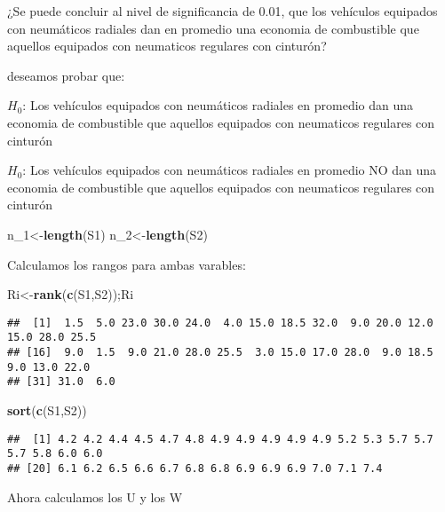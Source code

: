 \documentclass[
]{article}
\newenvironment{Shaded}{\begin{snugshade}}{\end{snugshade}}
\newcommand{\FunctionTok}[1]{\textcolor[rgb]{0.13,0.29,0.53}{\textbf{#1}}}
\newcommand{\NormalTok}[1]{#1}
\newcommand{\OtherTok}[1]{\textcolor[rgb]{0.56,0.35,0.01}{#1}}
\begin{document}
¿Se puede concluir al nivel de significancia de 0.01, que los vehículos
equipados con neumáticos radiales dan en promedio una economia de
combustible que aquellos equipados con neumaticos regulares con
cinturón?

deseamos probar que:

\(H_0\): Los vehículos equipados con neumáticos radiales en promedio dan
una economia de combustible que aquellos equipados con neumaticos
regulares con cinturón

\(H_0\): Los vehículos equipados con neumáticos radiales en promedio NO
dan una economia de combustible que aquellos equipados con neumaticos
regulares con cinturón

\begin{Shaded}
\begin{Highlighting}[]
\NormalTok{n\_1}\OtherTok{\textless{}{-}}\FunctionTok{length}\NormalTok{(S1)}
\NormalTok{n\_2}\OtherTok{\textless{}{-}}\FunctionTok{length}\NormalTok{(S2)}
\end{Highlighting}
\end{Shaded}

Calculamos los rangos para ambas varables:

\begin{Shaded}
\begin{Highlighting}[]
\NormalTok{Ri}\OtherTok{\textless{}{-}}\FunctionTok{rank}\NormalTok{(}\FunctionTok{c}\NormalTok{(S1,S2));Ri}
\end{Highlighting}
\end{Shaded}

\begin{verbatim}
##  [1]  1.5  5.0 23.0 30.0 24.0  4.0 15.0 18.5 32.0  9.0 20.0 12.0 15.0 28.0 25.5
## [16]  9.0  1.5  9.0 21.0 28.0 25.5  3.0 15.0 17.0 28.0  9.0 18.5  9.0 13.0 22.0
## [31] 31.0  6.0
\end{verbatim}

\begin{Shaded}
\begin{Highlighting}[]
\FunctionTok{sort}\NormalTok{(}\FunctionTok{c}\NormalTok{(S1,S2))}
\end{Highlighting}
\end{Shaded}

\begin{verbatim}
##  [1] 4.2 4.2 4.4 4.5 4.7 4.8 4.9 4.9 4.9 4.9 4.9 5.2 5.3 5.7 5.7 5.7 5.8 6.0 6.0
## [20] 6.1 6.2 6.5 6.6 6.7 6.8 6.8 6.9 6.9 6.9 7.0 7.1 7.4
\end{verbatim}

Ahora calculamos los U y los W
\end{document}
